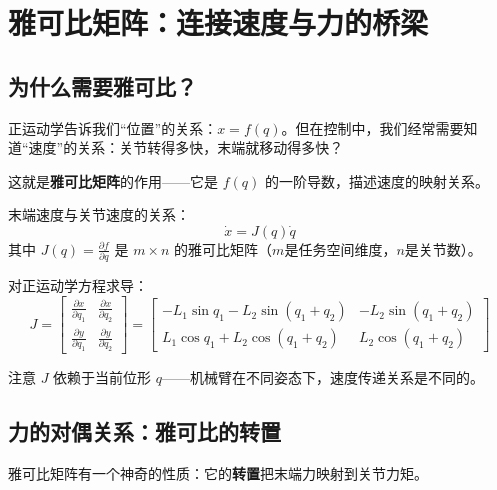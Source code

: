 \section{雅可比矩阵：连接速度与力的桥梁}

\subsection{为什么需要雅可比？}

正运动学告诉我们“位置”的关系：$x = f(q)$。但在控制中，我们经常需要知道“速度”的关系：关节转得多快，末端就移动得多快？

这就是\textbf{雅可比矩阵}的作用——它是 $f(q)$ 的一阶导数，描述速度的映射关系。

\begin{definition}[雅可比矩阵]
末端速度与关节速度的关系：
\begin{equation}
\dot{x} = J(q) \dot{q}
\end{equation}
其中 $J(q) = \frac{\partial f}{\partial q}$ 是 $m \times n$ 的雅可比矩阵（$m$是任务空间维度，$n$是关节数）。
\end{definition}

\begin{example}[双连杆机械臂的雅可比]
对正运动学方程求导：
\begin{equation}
J = \begin{bmatrix} 
\frac{\partial x}{\partial q_1} & \frac{\partial x}{\partial q_2} \\[6pt]
\frac{\partial y}{\partial q_1} & \frac{\partial y}{\partial q_2}
\end{bmatrix}
= \begin{bmatrix}
-L_1 \sin q_1 - L_2 \sin(q_1+q_2) & -L_2 \sin(q_1+q_2) \\
L_1 \cos q_1 + L_2 \cos(q_1+q_2) & L_2 \cos(q_1+q_2)
\end{bmatrix}
\end{equation}

注意 $J$ 依赖于当前位形 $q$——机械臂在不同姿态下，速度传递关系是不同的。
\end{example}

\subsection{力的对偶关系：雅可比的转置}

雅可比矩阵有一个神奇的性质：它的\textbf{转置}把末端力映射到关节力矩。

